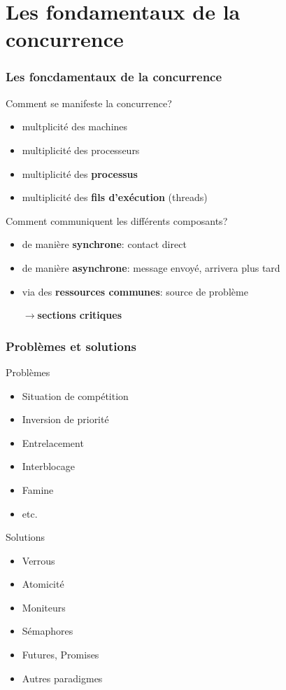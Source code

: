 \documentclass{beamer}
\begin{document}
\section{Les fondamentaux de la concurrence}
\begin{frame}
  \frametitle{Les foncdamentaux de la concurrence}
  Comment se manifeste la concurrence?
  \begin{itemize}
  \item multplicité des machines
  \item multiplicité des processeurs
  \item multiplicité des \textbf{processus}
  \item multiplicité des \textbf{fils d'exécution} (threads)
  \end{itemize}

  Comment communiquent les différents composants?
  \begin{itemize}
  \item de manière \textbf{synchrone}: contact direct
  \item de manière \textbf{asynchrone}: message envoyé, arrivera plus tard
  \item via des \textbf{ressources communes}: source de problème
    \par$\rightarrow$\textbf{sections critiques}
  \end{itemize}
\end{frame} %
\begin{frame}
  \frametitle{Problèmes et solutions}
  \begin{minipage}{.5\linewidth}
    Problèmes
    \begin{itemize}
    \item Situation de compétition
    \item Inversion de priorité
    \item Entrelacement
    \item Interblocage
    \item Famine
    \item etc.
    \end{itemize}
  \end{minipage}
  \begin{minipage}{.5\linewidth}
    Solutions
    \begin{itemize}
    \item Verrous
    \item Atomicité
    \item Moniteurs
    \item Sémaphores
    \item Futures, Promises
    \item Autres paradigmes
    \end{itemize}
  \end{minipage}
\end{frame} %
\end{document}
